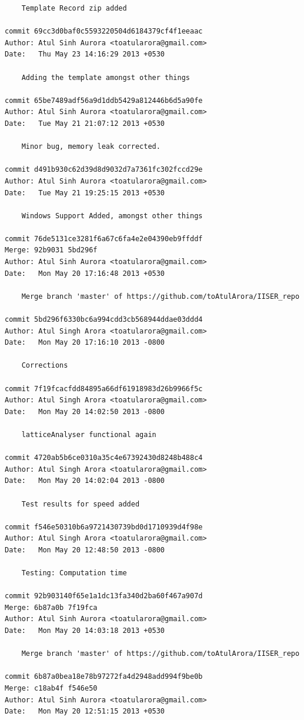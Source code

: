 \begin{lstlisting}
    Template Record zip added

commit 69cc3d0baf0c5593220504d6184379cf4f1eeaac
Author: Atul Sinh Aurora <toatularora@gmail.com>
Date:   Thu May 23 14:16:29 2013 +0530

    Adding the template amongst other things

commit 65be7489adf56a9d1ddb5429a812446b6d5a90fe
Author: Atul Sinh Aurora <toatularora@gmail.com>
Date:   Tue May 21 21:07:12 2013 +0530

    Minor bug, memory leak corrected.

commit d491b930c62d39d8d9032d7a7361fc302fccd29e
Author: Atul Sinh Aurora <toatularora@gmail.com>
Date:   Tue May 21 19:25:15 2013 +0530

    Windows Support Added, amongst other things

commit 76de5131ce3281f6a67c6fa4e2e04390eb9ffddf
Merge: 92b9031 5bd296f
Author: Atul Sinh Aurora <toatularora@gmail.com>
Date:   Mon May 20 17:16:48 2013 +0530

    Merge branch 'master' of https://github.com/toAtulArora/IISER_repo

commit 5bd296f6330bc6a994cdd3cb568944ddae03ddd4
Author: Atul Singh Arora <toatularora@gmail.com>
Date:   Mon May 20 17:16:10 2013 -0800

    Corrections

commit 7f19fcacfdd84895a66df61918983d26b9966f5c
Author: Atul Singh Arora <toatularora@gmail.com>
Date:   Mon May 20 14:02:50 2013 -0800

    latticeAnalyser functional again

commit 4720ab5b6ce0310a35c4e67392430d8248b488c4
Author: Atul Singh Arora <toatularora@gmail.com>
Date:   Mon May 20 14:02:04 2013 -0800

    Test results for speed added

commit f546e50310b6a9721430739bd0d1710939d4f98e
Author: Atul Singh Arora <toatularora@gmail.com>
Date:   Mon May 20 12:48:50 2013 -0800

    Testing: Computation time

commit 92b903140f65e1a1dc13fa340d2ba60f467a907d
Merge: 6b87a0b 7f19fca
Author: Atul Sinh Aurora <toatularora@gmail.com>
Date:   Mon May 20 14:03:18 2013 +0530

    Merge branch 'master' of https://github.com/toAtulArora/IISER_repo

commit 6b87a0bea18e78b97272fa4d2948add994f9be0b
Merge: c18ab4f f546e50
Author: Atul Sinh Aurora <toatularora@gmail.com>
Date:   Mon May 20 12:51:15 2013 +0530


\end{lstlisting}

